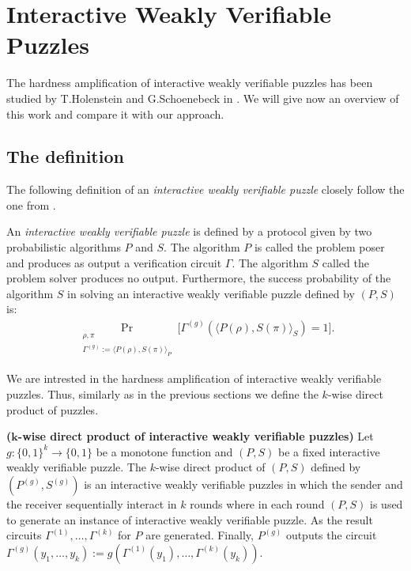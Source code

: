 \section{Interactive Weakly Verifiable Puzzles}
\label{section:iwvp}
The hardness amplification of interactive weakly verifiable puzzles has been studied by T.Holenstein and G.Schoenebeck in \cite{DBLP:journals/corr/abs-1002-3534}.
We will give now an overview of this work and compare it with our approach.

\subsection{The definition}
The following definition of an \textit{interactive weakly verifiable puzzle} closely follow the one from \cite{DBLP:journals/corr/abs-1002-3534}.
\begin{definition}
An \textit{interactive weakly verifiable puzzle} is defined by a protocol given by two probabilistic algorithms $P$ and $S$.
The algorithm $P$ is called the problem poser and produces as output a verification circuit $\Gamma$.
The algorithm $S$ called the problem solver produces no output.
Furthermore, the \textnormal{success probability} of the algorithm $S$ in solving an interactive weakly verifiable puzzle defined by $(P,S)$ is:
\begin{align*}
  \underset{\substack{\rho, \pi \\ \Gamma^{(g)} := \langle P(\rho), S(\pi) \rangle_{P}}}{\Pr}\Big[\Gamma^{(g)}(\langle P(\rho),S(\pi) \rangle_{S}) = 1 \Big].
\end{align*}
\end{definition}
We are intrested in the hardness amplification of interactive weakly verifiable puzzles. Thus, similarly as in the previous sections
we define the $k$-wise direct product of puzzles.
\begin{definition}\textbf{($\boldsymbol{k}$-wise direct product of interactive weakly verifiable puzzles)}
Let $g: \{0,1\}^{k} \rightarrow \{0,1\}$ be a monotone function and $(P,S)$ be a fixed interactive weakly verifiable puzzle.
The $k$-wise direct product of $(P,S)$ defined by $(P^{(g)}, S^{(g)})$ is an interactive weakly verifiable puzzles in which the sender and the receiver
sequentially interact in $k$ rounds where in each round $(P,S)$ is used to generate an instance of interactive weakly verifiable puzzle.
As the result circuits $\Gamma^{(1)}, \dotsc, \Gamma^{(k)}$ for $P$ are generated.
Finally, $P^{(g)}$ outputs the circuit $\Gamma^{(g)}(y_1, \dotsc, y_k) := g(\Gamma^{(1)}(y_1), \dotsc, \Gamma^{(k)}(y_k))$.
\end{definition}

